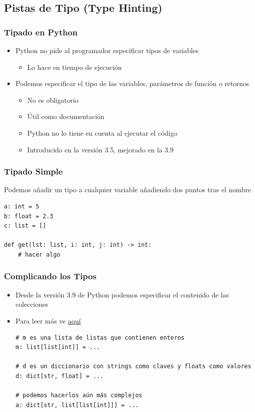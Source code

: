 \documentclass[11pt]{beamer}
\begin{document}
\subsection{Pistas de Tipo (Type Hinting)}

\begin{frame}\frametitle{Tipado en Python}
\begin{itemize}
\item Python no pide al programador especificar tipos de variables
    \begin{itemize}
    \item Lo hace en tiempo de ejecución
    \end{itemize}
\item Podemos especificar el tipo de las variables, parámetros de función o retornos
    \begin{itemize}
    \item No es obligatorio
    \item Útil como documentación
    \item Python no lo tiene en cuenta al ejecutar el código
    \item Introducido en la versión 3.5, mejorado en la 3.9
    \end{itemize}
\end{itemize}
\end{frame}

\begin{frame}[fragile]\frametitle{Tipado Simple}
\begin{block}{}
\centering Podemos añadir un tipo a cualquier variable añadiendo dos puntos tras el nombre
\end{block}
\begin{lstlisting}
a: int = 5
b: float = 2.3
c: list = []

def get(lst: list, i: int, j: int) -> int:
    # hacer algo
\end{lstlisting}
\end{frame}

\begin{frame}[fragile]\frametitle{Complicando los Tipos}
\begin{itemize}
\item Desde la versión 3.9 de Python podemos especificar el contenido de las colecciones
\item Para leer más ve \href{https://mypy.readthedocs.io/en/stable/cheat_sheet_py3.html}{\color{blue}\underline{aquí}}
\begin{lstlisting}
# m es una lista de listas que contienen enteros
m: list[list[int]] = ...

# d es un diccionario con strings como claves y floats como valores
d: dict[str, float] = ...

# podemos hacerlos aún más complejos
a: dict[str, list[list[int]]] = ...
\end{lstlisting}
\end{itemize}
\end{frame}
\end{document}
